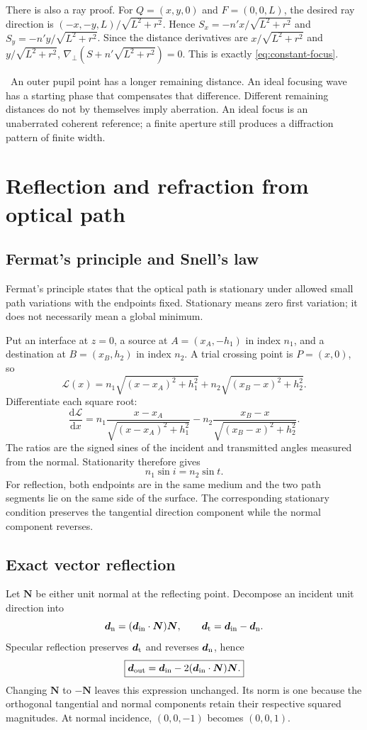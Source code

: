 \documentclass[11pt,a4paper]{article}
\numberwithin{equation}{section}
\newcommand{\dd}{\mathrm{d}}
\newcommand{\gradp}{\nabla_{\!\perp}}
\newcommand{\vct}[1]{\bm{#1}}
\newcommand{\note}[1]{\par\smallskip\noindent{\color{accent}\textbf{Interpretation.}}\ #1\par\smallskip}
\begin{document}
There is also a ray proof. For $Q=(x,y,0)$ and $F=(0,0,L)$, the desired
ray direction is $(-x,-y,L)/\sqrt{L^2+r^2}$. Hence
$S_x=-n'x/\sqrt{L^2+r^2}$ and $S_y=-n'y/\sqrt{L^2+r^2}$.
Since the distance derivatives are $x/\sqrt{L^2+r^2}$ and
$y/\sqrt{L^2+r^2}$,
$\gradp(S+n'\sqrt{L^2+r^2})=0$. This is exactly
\eqref{eq:constant-focus}.

\note{An outer pupil point has a longer remaining distance. An ideal
focusing wave has a starting phase that compensates that difference.
Different remaining distances do not by themselves imply aberration.
An ideal focus is an unaberrated coherent reference; a finite aperture
still produces a diffraction pattern of finite width.}

\section{Reflection and refraction from optical path}
\subsection{Fermat's principle and Snell's law}
Fermat's principle states that the optical path is stationary under allowed
small path variations with the endpoints fixed. Stationary means zero first
variation; it does not necessarily mean a global minimum.

Put an interface at $z=0$, a source at $A=(x_A,-h_1)$ in index $n_1$,
and a destination at $B=(x_B,h_2)$ in index $n_2$. A trial crossing point
is $P=(x,0)$, so
\[
 \mathcal L(x)
 =n_1\sqrt{(x-x_A)^2+h_1^2}
 +n_2\sqrt{(x_B-x)^2+h_2^2}.
\]
Differentiate each square root:
\[
 \frac{\dd\mathcal L}{\dd x}
 =n_1\frac{x-x_A}{\sqrt{(x-x_A)^2+h_1^2}}
 -n_2\frac{x_B-x}{\sqrt{(x_B-x)^2+h_2^2}}.
\]
The ratios are the signed sines of the incident and transmitted angles
measured from the normal. Stationarity therefore gives
\begin{equation}
 \boxed{n_1\sin i=n_2\sin t.}
\end{equation}
For reflection, both endpoints are in the same medium and the two path
segments lie on the same side of the surface. The corresponding stationary
condition preserves the tangential direction component while the normal
component reverses.

\subsection{Exact vector reflection}
Let $\vct N$ be either unit normal at the reflecting point. Decompose an
incident unit direction into
\[
 \vct d_{\rm n}=(\vct d_{\rm in}\cdot\vct N)\vct N,\qquad
 \vct d_{\rm t}=\vct d_{\rm in}-\vct d_{\rm n}.
\]
Specular reflection preserves $\vct d_{\rm t}$ and reverses
$\vct d_{\rm n}$, hence
\begin{equation}
 \boxed{
 \vct d_{\rm out}
 =\vct d_{\rm in}-2(\vct d_{\rm in}\cdot\vct N)\vct N.
 }
 \label{eq:reflection}
\end{equation}
Changing $\vct N$ to $-\vct N$ leaves this expression unchanged.
Its norm is one because the orthogonal tangential and normal components
retain their respective squared magnitudes. At normal incidence,
$(0,0,-1)$ becomes $(0,0,1)$.
\end{document}
